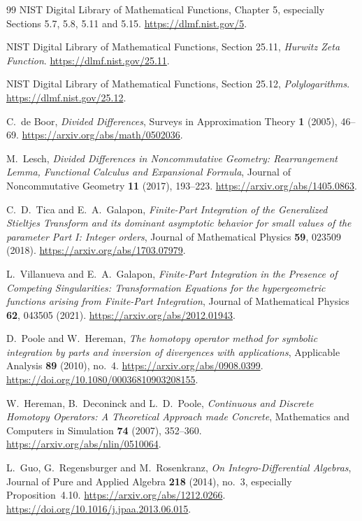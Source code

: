 \documentclass[11pt,a4paper]{article}
\theoremstyle{definition}
\theoremstyle{remark}
\numberwithin{equation}{section}
\begin{document}
\begin{thebibliography}{99}
NIST Digital Library of Mathematical Functions,
Chapter 5, especially Sections 5.7, 5.8, 5.11 and 5.15.
\url{https://dlmf.nist.gov/5}.

NIST Digital Library of Mathematical Functions,
Section 25.11, \emph{Hurwitz Zeta Function}.
\url{https://dlmf.nist.gov/25.11}.

NIST Digital Library of Mathematical Functions,
Section 25.12, \emph{Polylogarithms}.
\url{https://dlmf.nist.gov/25.12}.

C.~de Boor, \emph{Divided Differences},
Surveys in Approximation Theory \textbf{1} (2005), 46--69.
\url{https://arxiv.org/abs/math/0502036}.

M.~Lesch, \emph{Divided Differences in Noncommutative Geometry:
Rearrangement Lemma, Functional Calculus and Expansional Formula},
Journal of Noncommutative Geometry \textbf{11} (2017), 193--223.
\url{https://arxiv.org/abs/1405.0863}.

C.~D.~Tica and E.~A.~Galapon,
\emph{Finite-Part Integration of the Generalized Stieltjes Transform
and its dominant asymptotic behavior for small values of the parameter
Part I: Integer orders}, Journal of Mathematical Physics
\textbf{59}, 023509 (2018).
\url{https://arxiv.org/abs/1703.07979}.

L.~Villanueva and E.~A.~Galapon,
\emph{Finite-Part Integration in the Presence of Competing Singularities:
Transformation Equations for the hypergeometric functions arising from
Finite-Part Integration}, Journal of Mathematical Physics
\textbf{62}, 043505 (2021).
\url{https://arxiv.org/abs/2012.01943}.

D.~Poole and W.~Hereman,
\emph{The homotopy operator method for symbolic integration by parts
and inversion of divergences with applications},
Applicable Analysis \textbf{89} (2010), no.~4.
\url{https://arxiv.org/abs/0908.0399}.
\url{https://doi.org/10.1080/00036810903208155}.

W.~Hereman, B.~Deconinck and L.~D.~Poole,
\emph{Continuous and Discrete Homotopy Operators:
A Theoretical Approach made Concrete},
Mathematics and Computers in Simulation \textbf{74} (2007), 352--360.
\url{https://arxiv.org/abs/nlin/0510064}.

L.~Guo, G.~Regensburger and M.~Rosenkranz,
\emph{On Integro-Differential Algebras},
Journal of Pure and Applied Algebra \textbf{218} (2014), no.~3,
especially Proposition~4.10.
\url{https://arxiv.org/abs/1212.0266}.
\url{https://doi.org/10.1016/j.jpaa.2013.06.015}.

\end{thebibliography}
\end{document}
